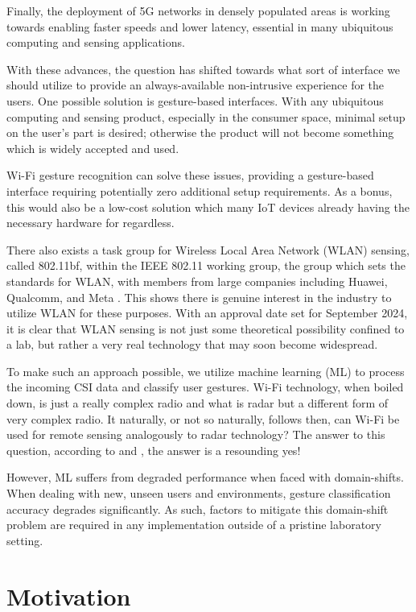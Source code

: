 Finally, the deployment of 5G networks in densely populated areas is working towards enabling faster speeds and lower latency, essential in many ubiquitous computing and sensing applications.

With these advances, the question has shifted towards what sort of interface we should utilize to provide an always-available non-intrusive experience for the users.
One possible solution is gesture-based interfaces.
With any ubiquitous computing and sensing product, especially in the consumer space, minimal setup on the user's part is desired; otherwise the product will not become something which is widely accepted and used.

Wi-Fi gesture recognition can solve these issues, providing a gesture-based interface requiring potentially zero additional setup requirements.
As a bonus, this would also be a low-cost solution which many IoT devices already having the necessary hardware for regardless.

There also exists a task group for Wireless Local Area Network (WLAN) sensing, called 802.11bf, within the IEEE 802.11 working group, the group which sets the standards for WLAN, with members from large companies including Huawei, Qualcomm, and Meta \cite{du2022overview}.
This shows there is genuine interest in the industry to utilize WLAN for these purposes.
With an approval date set for September 2024, it is clear that WLAN sensing is not just some theoretical possibility confined to a lab, but rather a very real technology that may soon become widespread.

To make such an approach possible, we utilize machine learning (ML) to process the incoming CSI data and classify user gestures.
Wi-Fi technology, when boiled down, is just a really complex radio and what is radar but a different form of very complex radio.
It naturally, or not so naturally, follows then, can Wi-Fi be used for remote sensing analogously to radar technology?
The answer to this question, according to \cite{adib2013see} and \cite{chetty2011through}, the answer is a resounding yes!

However, ML suffers from degraded performance when faced with domain-shifts.
When dealing with new, unseen users and environments, gesture classification accuracy degrades significantly. 
As such, factors to mitigate this domain-shift problem are required in any implementation outside of a pristine laboratory setting.

\section{Motivation}\label{sec:intro-motivation}

